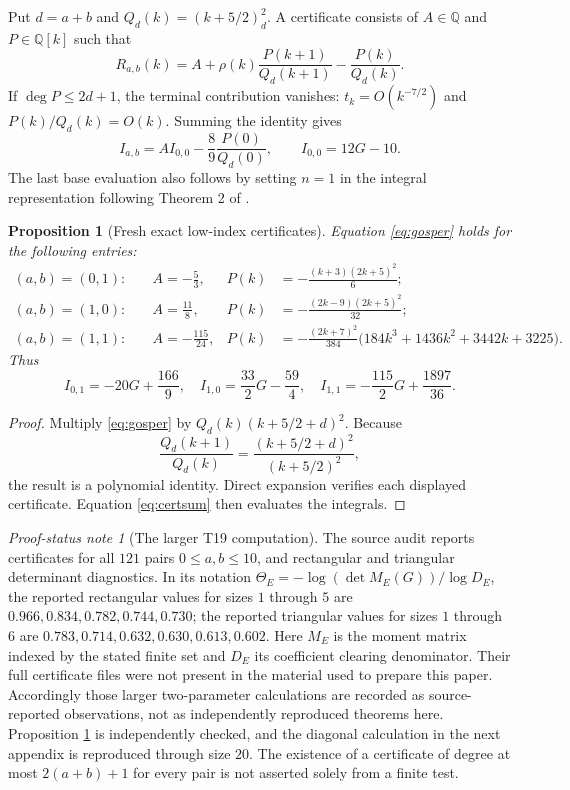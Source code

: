 \documentclass[11pt,a4paper]{article}
\newtheorem{proposition}[theorem]{Proposition}
\theoremstyle{definition}\newtheorem{definition}[theorem]{Definition}
\theoremstyle{remark}\newtheorem{remark}[theorem]{Remark}
\newtheorem{audit}[theorem]{Proof-status note}
\newcommand{\Q}{\mathbb Q}\newcommand{\Z}{\mathbb Z}\newcommand{\N}{\mathbb N}\newcommand{\R}{\mathbb R}\newcommand{\C}{\mathbb C}
\begin{document}
Put $d=a+b$ and $Q_d(k)=(k+5/2)_d^2$. A certificate consists of $A\in\Q$ and $P\in\Q[k]$ such that
\begin{equation}\label{eq:gosper}
 R_{a,b}(k)=A+\rho(k)\frac{P(k+1)}{Q_d(k+1)}
                 -\frac{P(k)}{Q_d(k)}.
\end{equation}
If $\deg P\le2d+1$, the terminal contribution vanishes: $t_k=O(k^{-7/2})$ and $P(k)/Q_d(k)=O(k)$. Summing the identity gives
\begin{equation}\label{eq:certsum}
 I_{a,b}=A I_{0,0}-\frac89\frac{P(0)}{Q_d(0)},\qquad
 I_{0,0}=12G-10.
\end{equation}
The last base evaluation also follows by setting $n=1$ in the integral representation following Theorem 2 of \cite{Z02}.

\begin{proposition}[Fresh exact low-index certificates]\label{prop:low}
Equation \eqref{eq:gosper} holds for the following entries:
\begin{align*}
 (a,b)=(0,1):&\quad A=-\frac53,
 &P(k)&=-\frac{(k+3)(2k+5)^2}{6};\\
 (a,b)=(1,0):&\quad A=\frac{11}{8},
 &P(k)&=-\frac{(2k-9)(2k+5)^2}{32};\\
 (a,b)=(1,1):&\quad A=-\frac{115}{24},
 &P(k)&=-\frac{(2k+7)^2}{384}
 \bigl(184k^3+1436k^2+3442k+3225\bigr).
\end{align*}
Thus
\[
 I_{0,1}=-20G+\frac{166}{9},\quad
 I_{1,0}=\frac{33}{2}G-\frac{59}{4},\quad
 I_{1,1}=-\frac{115}{2}G+\frac{1897}{36}.
\]
\end{proposition}
\begin{proof}
Multiply \eqref{eq:gosper} by $Q_d(k)(k+5/2+d)^2$. Because
\[
 \frac{Q_d(k+1)}{Q_d(k)}
 =\frac{(k+5/2+d)^2}{(k+5/2)^2},
\]
the result is a polynomial identity. Direct expansion verifies each displayed certificate. Equation \eqref{eq:certsum} then evaluates the integrals.
\end{proof}

\begin{audit}[The larger T19 computation]
The source audit reports certificates for all $121$ pairs $0\le a,b\le10$, and rectangular and triangular determinant diagnostics. In its notation $\Theta_E=-\log(\det M_E(G))/\log D_E$, the reported rectangular values for sizes $1$ through $5$ are $0.966,0.834,0.782,0.744,0.730$; the reported triangular values for sizes $1$ through $6$ are $0.783,0.714,0.632,0.630,0.613,0.602$. Here $M_E$ is the moment matrix indexed by the stated finite set and $D_E$ its coefficient clearing denominator. Their full certificate files were not present in the material used to prepare this paper. Accordingly those larger two-parameter calculations are recorded as source-reported observations, not as independently reproduced theorems here. Proposition \ref{prop:low} is independently checked, and the diagonal calculation in the next appendix is reproduced through size $20$. The existence of a certificate of degree at most $2(a+b)+1$ for every pair is not asserted solely from a finite test.
\end{audit}
\end{document}
